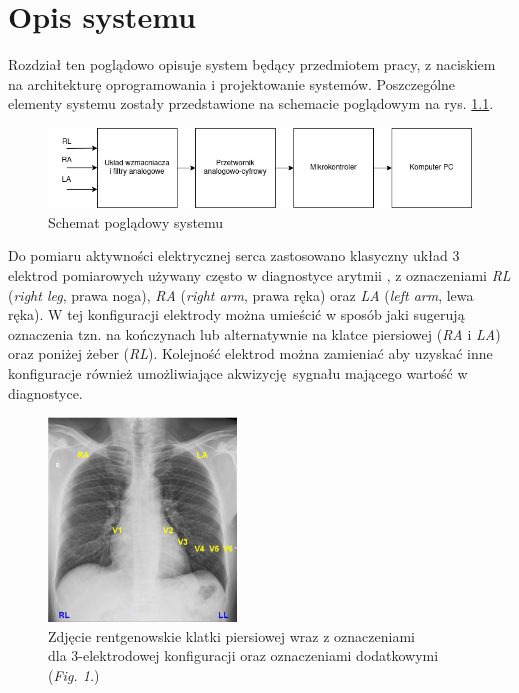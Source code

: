 
\chapter{Opis systemu}

Rozdział ten poglądowo opisuje system będący przedmiotem pracy, z naciskiem na 
architekturę oprogramowania i projektowanie systemów. 
Poszczególne elementy systemu zostały przedstawione na schemacie poglądowym na rys. \ref{fig:hl_sys}.

\begin{figure}[h!]
    \centering 
    \includegraphics[scale=0.6]{pl/media/hl_system.png}
    \caption{Schemat poglądowy systemu}
    \label{fig:hl_sys}
\end{figure}

Do pomiaru aktywności elektrycznej serca zastosowano klasyczny układ 3 elektrod pomiarowych używany często
w diagnostyce arytmii \cite{FRANCIS201692}, z oznaczeniami \textit{RL} (\textit{right leg}, prawa noga), 
\textit{RA} (\textit{right arm}, prawa ręka) oraz \textit{LA} (\textit{left arm}, lewa ręka). W tej 
konfiguracji elektrody można umieścić w sposób jaki sugerują oznaczenia tzn. na kończynach lub alternatywnie 
na klatce piersiowej (\textit{RA} i \textit{LA}) oraz poniżej żeber (\textit{RL}). 
Kolejność elektrod można zamieniać aby uzyskać inne konfiguracje również umożliwiające akwizycję sygnału
mającego wartość w diagnostyce.

\begin{figure}[h!]
    \centering 
    \includegraphics[scale=1]{pl/media/electrodes.png}
    \caption{Zdjęcie rentgenowskie klatki piersiowej wraz z oznaczeniami\\ dla 3-elektrodowej konfiguracji oraz oznaczeniami dodatkowymi
    \cite{FRANCIS201692}(\textit{Fig. 1.})}
    \label{fig:ele}
\end{figure}

